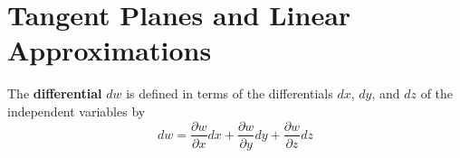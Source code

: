 \section{Tangent Planes and Linear Approximations}
\begin{definition}
	The \textbf{differential} $dw$ is defined in terms of the differentials $dx$, $dy$, and $dz$ of the independent variables by
	\begin{equation}
	\label{equation-differentials-3d}
	dw = \frac{\partial w}{\partial x}dx + \frac{\partial w}{\partial y}dy + \frac{\partial w}{\partial z}dz
	\end{equation}
\end{definition}
